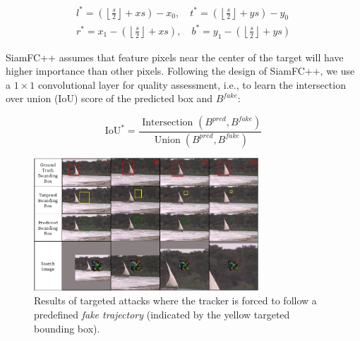 \documentclass[journal]{IEEEtran}
\begin{document}
\begin{equation}
  \begin{array}{ll}
  l^{*}=\left(\left\lfloor\frac{s}{2}\right\rfloor+x s\right)-x_{0}, \quad t^{*}=\left(\left\lfloor\frac{s}{2}\right\rfloor+y s\right)-y_{0} \\
  r^{*}=x_{1}-\left(\left\lfloor\frac{s}{2}\right\rfloor+x s\right), \quad b^{*}=y_{1}-\left(\left\lfloor\frac{s}{2}\right\rfloor+y s\right)
  \end{array}
\end{equation}

SiamFC++ assumes that feature pixels near the center of the target will have higher importance than other pixels. Following the design of SiamFC++, we use a $1 \times 1$ convolutional layer for quality assessment, i.e., to learn the intersection over union (IoU) score of the predicted box and $B^{fake}$:

\begin{equation}
  \mathrm{IoU}^{*}=\frac{\text { Intersection }\left(B^{pred}, B^{fake}\right)}{\operatorname{Union}\left(B^{pred}, B^{fake}\right)}
\end{equation}

\begin{figure}[t]
  \centering
  \includegraphics[width=0.75\textwidth]{images/vis_v6.pdf}
  \caption{Results of targeted attacks where the tracker is forced to follow a predefined \textit{fake trajectory} (indicated by the yellow targeted bounding box).}
  \label{fig:vis}
\end{figure}
\end{document}
